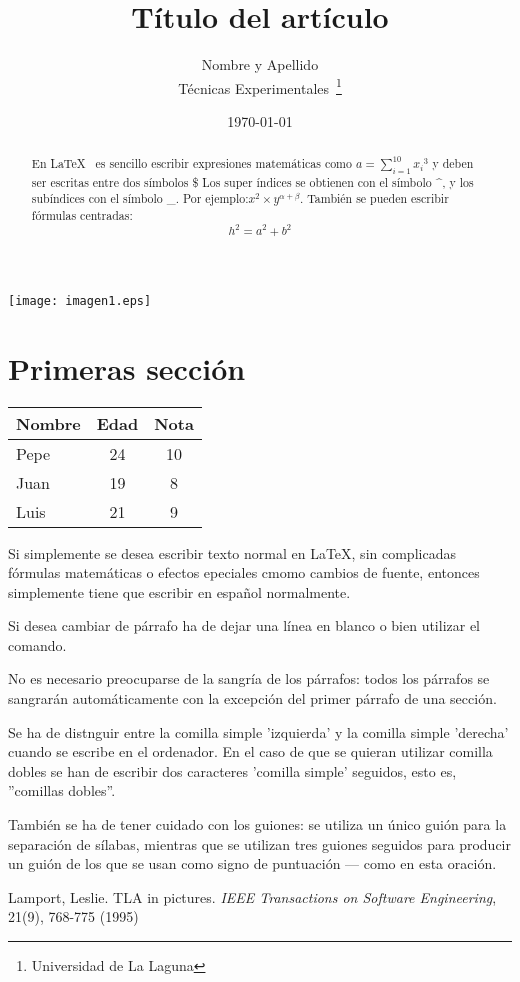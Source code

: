 \documentclass[a4paper,12pt]{article}
\begin{document}
\texttt{[image: imagen1.eps]}
\title{Título del artículo}
\author{Nombre y Apellido \\
	Técnicas Experimentales~\footnote{Universidad de La Laguna}
	}
\date{\today}
\maketitle
\begin{abstract}
  En \LaTeX{}~\cite{Lam:86} es sencillo escribir expresiones
  matemáticas como $a=\sum_{i=1}^{10} {x_i}^{3}$
  y deben ser escritas entre dos símbolos \$
  Los super índices se obtienen con el símbolo \^{}, y
  los subíndices con el símbolo \_.
  Por ejemplo:$x^2 \times y^{\alpha + \beta}$.
  También se pueden escribir fórmulas centradas:
  \[h^2=a^2 + b^2 \]
\end{abstract}

\section{Primeras sección}

\bigskip
\begin{tabular}{|l|c|c|}
\hline
  Nombre & Edad & Nota \\ \hline
  Pepe   &  24  &   10 \\ \hline
  Juan   &  19  &    8 \\ \hline
  Luis   &  21  &    9 \\ \hline
\end{tabular}

Si simplemente se desea escribir texto normal en \LaTeX{}, 
sin complicadas f\'ormulas matem\'aticas o efectos epeciales
cmomo cambios de fuente, entonces simplemente tiene que escribir
en espa\~nol normalmente.\par
Si desea cambiar de párrafo ha de dejar una línea en blanco o bien
utilizar el comando.\par
No es necesario preocuparse de la sangría de los párrafos:
todos los párrafos se sangrarán automáticamente con la excepción
del primer párrafo de una sección.

Se ha de distnguir entre la comilla simple 'izquierda'
y la comilla simple 'derecha' cuando se escribe en el ordenador.
En el caso de que se quieran utilizar co\-mi\-lla dobles se han de
escribir dos caracteres 'comilla simple' seguidos, esto es, 
''comillas dobles''.

También se ha de tener cuidado con los guiones: se utiliza un único
guión para la separación de sílabas, mientras que se utilizan
tres guiones seguidos para producir un guión de los que se usan
como signo de puntuación --- como en esta oración.
\begin{thebibliography}{00}
    Lamport, Leslie.
    TLA in pictures.
    \emph{IEEE Transactions on Software Engineering},
    21(9), 768-775
    (1995)
\end{thebibliography}
\end{document}

